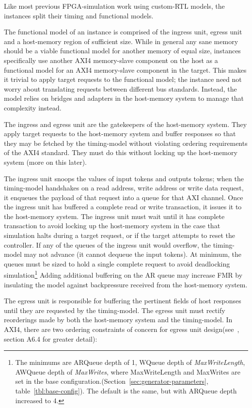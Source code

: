 Like most previous FPGA-simulation work using custom-RTL models, the instances
split their timing and functional models.

The functional model of an instance is comprised of the ingress unit, egress
unit and a host-memory region of sufficient size. While in general any sane
memory should be a viable functional model for another memory of equal size,
instances specifically use another AXI4 memory-slave component on the host as a
functional model for an AXI4 memory-slave component in the target. This makes
it trivial to apply target requests to the functional model; the instance need
not worry about translating requests between different bus standards. Instead,
the model relies on bridges and adapters in the host-memory system to manage
that complexity instead.

The ingress and egress unit are the gatekeepers of the host-memory system. They
apply target requests to the host-memory system and buffer responses so that
they may be fetched by the timing-model without violating ordering requirements
of the AXI4 standard. They must do this without locking up the host-memory
system (more on this later).

The ingress unit snoops the values of input tokens and outputs tokens; when the
timing-model handshakes on a read address, write address or write data request,
it enqueues the payload of that request into a queue for that AXI channel. Once
the ingress unit has buffered a complete read or write transaction, it issues
it to the host-memory system. The ingress unit must wait until it has complete
transaction to avoid locking up the host-memory system in the case that
simulation halts during a target request, or if the target attempts to reset
the controller.  If any of the queues of the ingress unit would overflow, the
timing-model may not advance (it cannot dequeue the input tokens). At minimum,
the queues must be sized to hold a single complete request to avoid deadlocking
simulation\footnote{The minimums are ARQueue depth of 1, WQueue depth of
\emph{MaxWriteLength}, AWQueue depth of \emph{MaxWrites}, where MaxWriteLength
and MaxWrites are set in the base
configuration.(Section~\ref{sec:generator-parameters},
table~\ref{tbl:base-config}). The default is the same, but with ARQueue depth
increased to 4.} Adding additional buffering on the AR queue may increase FMR
by insulating the model against backpressure received from the host-memory
system.

The egress unit is responsible for buffering the pertinent fields of host
responses until they are requested by the timing-model. The egress unit must
rectify reorderings made by both the host-memory system and the timing-model.
In AXI4, there are two ordering constraints of concern for egress unit
design(see~\cite{amba}, section A6.4 for greater detail):

